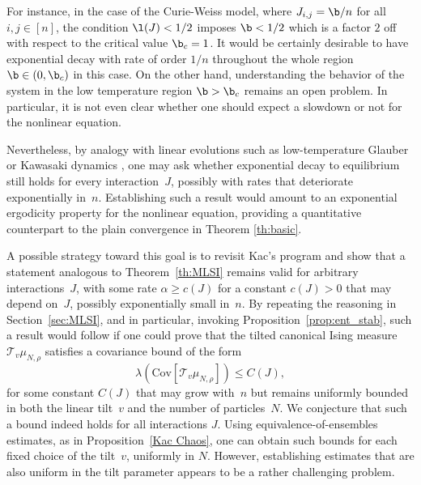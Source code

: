 \documentclass[11pt,reqno]{amsart}
\numberwithin{equation}{section}
\numberwithin{figure}{section}
\newcommand{\1}{\mathds{1}}
\begin{document}
For instance,  in the case of the Curie-Weiss model, where 
 $J_{i,j} = \b/n$ for all $i,j\in[n]$, the condition $\l(J)<1/2$ imposes $\b<1/2$ which is a factor $2$ off with respect to the critical value $\b_c=1$. It would be certainly desirable to have exponential decay with rate of order $1/n$ throughout the whole region $\b\in(0,\b_c)$ in this case. 
On the other hand, understanding the behavior of the system in the low temperature region $\b>\b_c$ remains an open problem. 
In particular, it is not even clear whether one should expect a slowdown or not for the nonlinear equation.  
 
 
 Nevertheless, by analogy with linear evolutions such as low-temperature Glauber or Kawasaki dynamics \cite{Martinelli}, one may ask whether exponential decay to equilibrium still holds for every interaction~$J$, possibly with rates that deteriorate exponentially in~$n$.  
Establishing such a result would amount to an exponential ergodicity property for the nonlinear equation, providing a quantitative counterpart to the plain convergence in Theorem \ref{th:basic}.  


A possible strategy toward this goal is to revisit Kac's program and show that a statement analogous to Theorem~\ref{th:MLSI} remains valid for arbitrary interactions~$J$, with some rate \( \alpha \ge c(J) \) for a constant \( c(J) > 0 \) that may depend on~$J$, possibly exponentially small in~$n$.  
By repeating the reasoning in Section~\ref{sec:MLSI}, and in particular, invoking Proposition~\ref{prop:ent_stab}, such a result would follow if one could prove that the tilted canonical Ising measure \( \mathcal{T}_v \mu_{N,\rho} \) satisfies a covariance bound of the form
\[
\lambda\!\left( \mathrm{Cov}[\mathcal{T}_v \mu_{N,\rho}] \right) \le C(J),
\]
for some constant \( C(J) \) that may grow with~$n$ but remains uniformly bounded in both the linear tilt~$v$ and the number of particles~$N$.  
We conjecture  that such a bound indeed holds for all interactions $J$. %
Using equivalence-of-ensembles estimates, as in Proposition~\ref{Kac Chaos}, one can obtain such bounds for each fixed choice of the tilt~$v$, uniformly in $N$.  
However, establishing estimates that are also uniform in the tilt parameter appears to be a rather challenging problem.  
\end{document}
